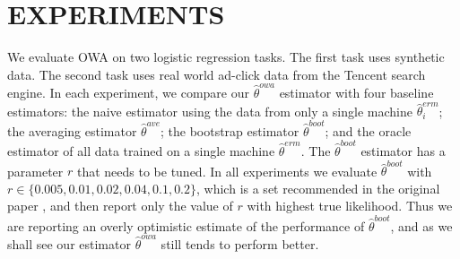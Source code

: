 \documentclass[twoside]{article}
\newcommand{\w}{\theta}
\newcommand{\wowa}{\hat\w^{owa}}
\newcommand{\wave}{\hat\w^{ave}}
\newcommand{\wboot}{\hat\w^{boot}}
\newcommand{\wmle}{\hat\w^{erm}}
\begin{document}

\section{EXPERIMENTS}
\label{sec:exp}

We evaluate OWA on two logistic regression tasks.
The first task uses synthetic data.
The second task uses real world ad-click data from the Tencent search engine.
In each experiment, we compare our $\wowa$ estimator with four baseline estimators:
the naive estimator using the data from only a single machine $\wmle_i$;
the averaging estimator $\wave$;
the bootstrap estimator $\wboot$;
and the oracle estimator of all data trained on a single machine $\wmle$.
The $\wboot$ estimator has a parameter $r$ that needs to be tuned.
In all experiments we evaluate $\wboot$ with $r \in \{0.005,0.01,0.02,0.04,0.1,0.2\}$,
which is a set recommended in the original paper \citep{zhang2012communication},
and then report only the value of $r$ with highest true likelihood.
Thus we are reporting an overly optimistic estimate of the performance of $\wboot$,
and as we shall see our estimator $\wowa$ still tends to perform better.
\end{document}
